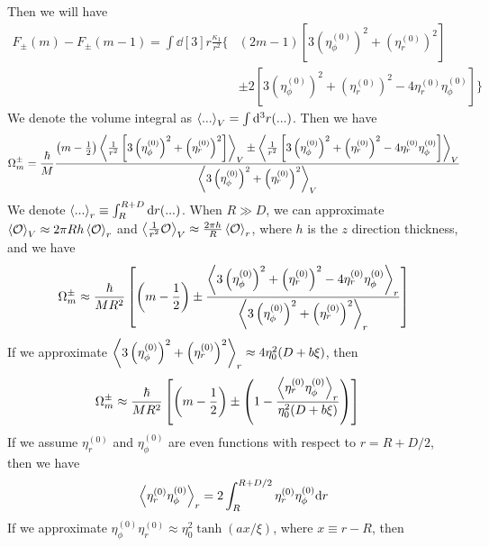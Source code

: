 \documentclass[aps,prl,preprint]{revtex4-2}
\begin{document}
Then we will have
\begin{align}
    F_\pm(m) - F_\pm(m-1) = \int\dd[3]r\frac{\kappa_1}{r^2}\Bigg\{ & (2m-1)\left[3\left(\eta^{(0)}_\phi\right)^2 + \left(\eta^{(0)}_r\right)^2\right]\nonumber                           \\
                                                                   & \pm 2\left[3\left(\eta^{(0)}_\phi\right)^2 + \left(\eta^{(0)}_r\right)^2-4\eta^{(0)}_r\eta^{(0)}_\phi\right]\Bigg\}
\end{align}
We denote the volume integral as $\ev{...}_V = \int\dd[3]r(...)$.
Then we have
\begin{align}
    \Omega_m^\pm = \frac{\hbar}{M}
    \frac{\left(m-\frac{1}{2}\right)\ev{\frac{1}{r^2}\left[3\left(\eta^{(0)}_\phi\right)^2 + \left(\eta^{(0)}_r\right)^2\right]}_V
        \pm \ev{\frac{1}{r^2}\left[3\left(\eta^{(0)}_\phi\right)^2 + \left(\eta^{(0)}_r\right)^2-4\eta^{(0)}_r\eta^{(0)}_\phi\right]}_V}
    {\ev{3\left(\eta^{(0)}_\phi\right)^2 + \left(\eta^{(0)}_r\right)^2}_V}\nonumber
\end{align}
We denote $\ev{...}_r \equiv \int_R^{R+D}\dd r(...)$.
When $R\gg D$, we can approximate $\ev{\mathcal{O}}_V\approx 2\pi Rh\ev{\mathcal{O}}_r$
and $\ev{\frac{1}{r^2}\mathcal{O}}_V\approx \frac{2\pi h}{R}\ev{\mathcal{O}}_r$,
where $h$ is the $z$ direction thickness, and we have
\begin{align}\label{omega_m_approx}
    \Omega_m^\pm \approx \frac{\hbar}{MR^2}
    \left[\left(m-\frac{1}{2}\right)\pm
        \frac{\ev{3\left(\eta^{(0)}_\phi\right)^2 + \left(\eta^{(0)}_r\right)^2-4\eta^{(0)}_r\eta^{(0)}_\phi}_r}
        {\ev{3\left(\eta^{(0)}_\phi\right)^2 + \left(\eta^{(0)}_r\right)^2}_r}\right]
\end{align}
If we approximate
$\ev{3\left(\eta^{(0)}_\phi\right)^2 + \left(\eta^{(0)}_r\right)^2}_r\approx 4\eta_0^2(D + b\xi)$,
then
\begin{align}
    \Omega_m^\pm & \approx \frac{\hbar}{MR^2}
    \left[\left(m-\frac{1}{2}\right)\pm
        \left(1-\frac{\ev{\eta^{(0)}_r\eta^{(0)}_\phi}_r}{\eta_0^2(D+b\xi)}\right)\right]
\end{align}
If we assume $\eta^{(0)}_r$ and $\eta^{(0)}_\phi$ are even functions
with respect to $r=R+D/2$, then we have
\begin{align}
    \ev{\eta^{(0)}_r\eta^{(0)}_\phi}_r = 2\int_R^{R+D/2}\eta^{(0)}_r\eta^{(0)}_\phi\dd r
\end{align}
If we approximate $\eta_\phi^{(0)}\eta_r^{(0)}\approx \eta_0^2\tanh(ax/\xi)$,
where $x \equiv r-R$, then
\end{document}
